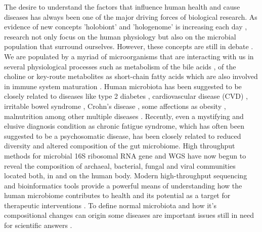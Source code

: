 The desire to understand the factors that influence human health and cause diseases has always been one of the major driving forces of biological research. As evidence of new concepts 'holobiont' and 'hologenome' is increasing each day \cite{holo1, holo2}, research not only focus on the human physiology but also on the microbial population that surround ourselves. However, these concepts are still in debate \cite{holo3}. We are populated by a myriad of microorganisms that are interacting with us in several physiological processes such as metabolism of the bile acids \cite{bileacids}, of the choline \cite{choline} or key-route metabolites as short-chain fatty acids \cite{scfa1, scfa2} which are also involved in immune system maturation \cite{scfa3, scfa4}. Human microbiota has been suggested to be closely related to diseases like type 2 diabetes \cite{diabetes2}, cardiovascular disease (CVD) \cite{CVD}, irritable bowel syndrome \cite{IBS}, Crohn's disease \cite{CD}, some affections as obesity \cite{ob1, ob2}, malnutrition \cite{nutr} among other multiple diseases \cite{Moya_trends}. Recently, even a mystifying and elusive diagnosis condition as chronic fatigue syndrome, which has often been suggested to be a psychosomatic disease, has been closely related to reduced diversity and altered composition of the gut microbiome\cite{CFS}. High throughput methods for microbial 16S ribosomal RNA gene and WGS have now begun to reveal the composition of archaeal, bacterial, fungal and viral communities located both, in and on the human body. Modern high-throughput sequencing and bioinformatics tools provide a powerful means of understanding how the human microbiome contributes to health and its potential as a target for therapeutic interventions \cite{microb&health}. To define normal microbiota and how it's compositional changes can origin some diseases are important issues still in need for scientific answers \cite{normal1, normal2}.

